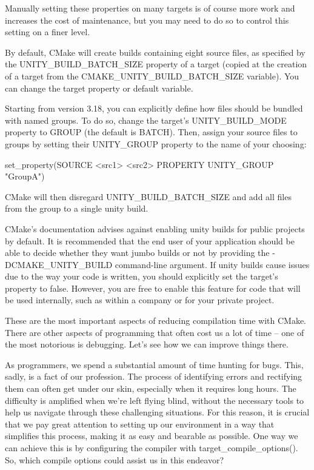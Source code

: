 Manually setting these properties on many targets is of course more work and increases the cost of maintenance, but you may need to do so to control this setting on a finer level.

By default, CMake will create builds containing eight source files, as specified by the UNITY\_BUILD\_BATCH\_SIZE property of a target (copied at the creation of a target from the CMAKE\_UNITY\_BUILD\_BATCH\_SIZE variable). You can change the target property or default variable.

Starting from version 3.18, you can explicitly define how files should be bundled with named groups. To do so, change the target’s UNITY\_BUILD\_MODE property to GROUP (the default is BATCH). Then, assign your source files to groups by setting their UNITY\_GROUP property to the name of your choosing:

\begin{shell}
set_property(SOURCE <src1> <src2> PROPERTY UNITY_GROUP "GroupA")
\end{shell}

CMake will then disregard UNITY\_BUILD\_BATCH\_SIZE and add all files from the group to a single unity build.

CMake’s documentation advises against enabling unity builds for public projects by default. It is recommended that the end user of your application should be able to decide whether they want jumbo builds or not by providing the -DCMAKE\_UNITY\_BUILD command-line argument. If unity builds cause issues due to the way your code is written, you should explicitly set the target’s property to false. However, you are free to enable this feature for code that will be used internally, such as within a company or for your private project.

These are the most important aspects of reducing compilation time with CMake. There are other aspects of programming that often cost us a lot of time – one of the most notorious is debugging.
Let’s see how we can improve things there.


As programmers, we spend a substantial amount of time hunting for bugs. This, sadly, is a fact of our profession. The process of identifying errors and rectifying them can often get under our skin, especially when it requires long hours. The difficulty is amplified when we’re left flying blind, without the necessary tools to help us navigate through these challenging situations. For this reason, it is crucial that we pay great attention to setting up our environment in a way that simplifies this process, making it as easy and bearable as possible. One way we can achieve this is by configuring the compiler with target\_compile\_options(). So, which compile options could assist us in this endeavor?

